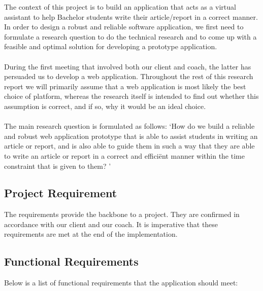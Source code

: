 The context of this project is to build an application that acts as a virtual assistant to help Bachelor students write their article/report in a correct manner. In order to design a robust and reliable software application, we first need to formulate a research question to do the technical research and to come up with a feasible and optimal solution for developing a prototype application.\\\\

During the first meeting that involved both our client and coach, the latter has persuaded us to develop a web application. Throughout the rest of this research report we will primarily assume that a web application is most likely the best choice of platform, whereas the research itself is intended to find out whether this assumption is correct, and if so, why it would be an ideal choice. \\\\

The main research question is formulated as follows: `How do we build a reliable and robust web application prototype that is able to assist students in writing an article or report, and is also able to guide them in such a way that they are able to write an article or report in a correct and effici\"ent manner within the time constraint that is given to them? '

\subsection{Project Requirement}

The requirements provide the backbone to a project. They are confirmed in accordance with our client and our coach. It is imperative that these requirements are met at the end of the implementation.

\subsection{Functional Requirements} %
\label{sub:functional_requirement}

Below is a list of functional requirements that the application should meet:

